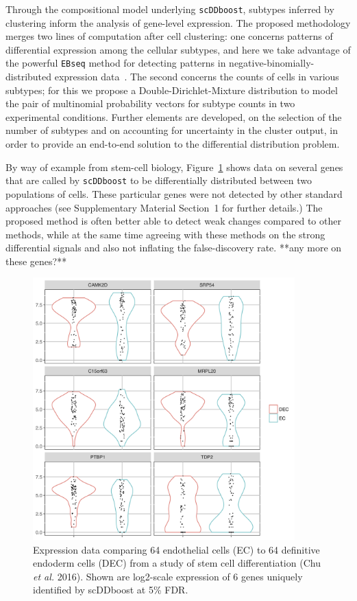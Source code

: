 \documentclass[aoas,preprint]{imsart}
\begin{document}
Through the compositional model underlying \verb+scDDboost+, subtypes inferred by clustering 
inform the analysis of gene-level expression.  The proposed methodology merges two lines of computation
after cell clustering: one concerns patterns of differential expression among 
the cellular subtypes, and here we take advantage of the powerful \verb+EBseq+ method for detecting
patterns in negative-binomially-distributed expression data~\citep{ref:Leng}.  The second concerns 
the counts of cells in various subtypes; for this we propose a Double-Dirichlet-Mixture distribution
to model the pair of multinomial probability vectors for subtype counts in two experimental conditions.
Further elements are developed, on the selection of the number of subtypes and on accounting for uncertainty in the cluster output,  in order to provide an end-to-end solution to the differential distribution
problem.  

By way of example from  stem-cell biology,
Figure~\ref{fig:whet} shows data on several genes that are called by \verb+scDDboost+ to be
differentially distributed between two populations of cells. These particular genes
were not detected by other standard approaches (see Supplementary Material Section~1 for further details.)  
The proposed method is often better able to detect weak changes
compared to other methods, while at the same time 
agreeing with these methods on the strong differential signals and also not inflating the false-discovery rate. 
 **any more on these genes?**

\begin{figure}[H]
\includegraphics[width = 0.9\textwidth]{Figs/density_DEC_dd.png}
 \caption{Expression data comparing 64 endothelial cells (EC) to 64 definitive endoderm cells (DEC)
 from a study of stem cell differentiation (Chu {\em et al.} 2016). Shown are log2-scale expression
of  6 genes uniquely identified by scDDboost at 5\% FDR.  \label{fig:whet} }
\end{figure}
\end{document}
